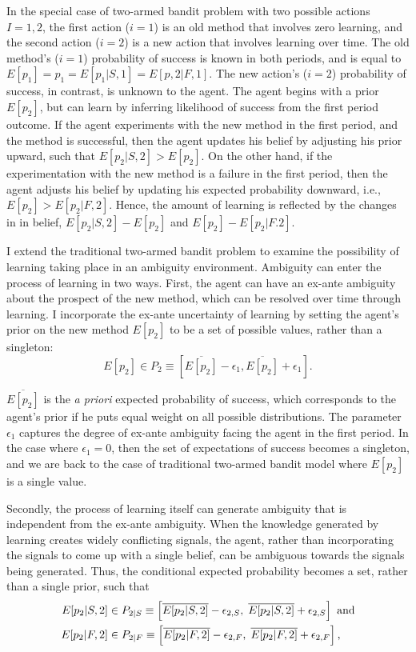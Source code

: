 \documentclass[11pt]{article} %
\theoremstyle{exampstyle}
\newcommand{\be}{\begin{equation}}
\newcommand{\ee}{\end{equation}}
\newcommand{\eq}[1]{\begin{align}#1\end{align}}
\begin{document}
In the special case of two-armed bandit problem with two possible actions $I={1,2}$, the first action ($i=1$) is an old method that involves zero learning, and the second action ($i=2$) is a new action that involves learning over time. The old method's ($i=1$) probability of success is known in both periods, and is equal to $  E[p_1] = p_1 = E[p_1 | S,1] = E[p,2 | F, 1]$. The new action's ($i=2$) probability of success, in contrast, is unknown to the agent. The agent begins with a prior $E[p_2]$, but can learn by inferring likelihood of success from the first period outcome. If the agent experiments with the new method in the first period, and the method is successful, then the agent updates his belief by adjusting his prior upward, such that $E[p_2 | S,2]>E[p_2]$. On the other hand, if the experimentation with the new method is a failure in the first period, then the agent adjusts his belief by updating his expected probability downward, i.e., $E[p_2] > E[p_2 |F, 2]$. Hence, the amount of learning is reflected by the changes in in belief, $E[p_2|S,2] - E[p_2]$ and $E[p_2] - E[p_2|F.2]$. 

I extend the traditional two-armed bandit problem to examine the possibility of learning taking place in an ambiguity environment. Ambiguity can enter the process of learning in two ways. First, the agent can have an ex-ante ambiguity about the prospect of the new method, which can be resolved over time through learning. I incorporate the ex-ante uncertainty of learning by setting the agent's prior on the new method $E[p_2]$ to be a set of possible values, rather than a singleton:
\be
E[p_2] \in P_{2} \equiv [\overline{E[p_2]}- \epsilon_1, \overline{E[p_2]} + \epsilon_1 ] . 
\ee

$\overline{E[p_2]}$ is the \emph{a priori} expected probability of success, which corresponds to the agent's prior if he puts equal weight on all possible distributions. The parameter $\epsilon_1$ captures the degree of ex-ante ambiguity facing the agent in the first period. In the case where $\epsilon_1 = 0$, then the set of expectations of success becomes a singleton, and we are back to the case of traditional two-armed bandit model where $E[p_2]$ is a single value.

Secondly, the process of learning itself can generate ambiguity that is independent from the ex-ante ambiguity. When the knowledge generated by learning creates widely conflicting signals, the agent, rather than incorporating the signals to come up with a single belief, can be ambiguous towards the signals being generated. Thus, the conditional expected probability becomes a set, rather than a single prior, such that 
\eq{
E[p_2 |S,2] & \in P_{2|S} \equiv \left [\overline{E[p_2 |S,2]}- \epsilon_{2,S},\; \overline{E[p_2 |S,2]} + \epsilon_{2,S} \right] \text{ and}  \\
E[p_2 |F,2] & \in P_{2|F} \equiv \left [\overline{E[p_2 |F,2]}- \epsilon_{2,F},\; \overline{E[p_2 |F,2]} + \epsilon_{2,F} \right] \notag,	
} 
\end{document}
